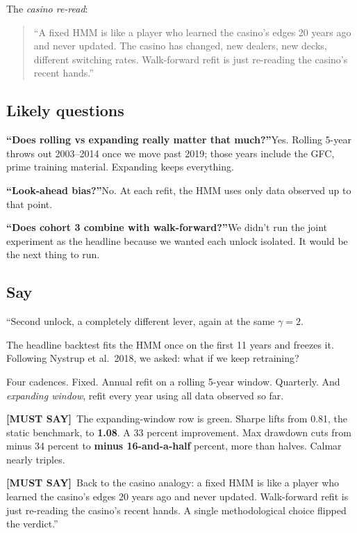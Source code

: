 \documentclass[11pt]{article}
\newcommand{\mustsay}[1]{\textcolor{must}{\textbf{[MUST SAY]}}\ #1}
\begin{document}
The \emph{casino re-read}:

\begin{quote}
``A fixed HMM is like a player who learned the casino's edges 20 years ago and never updated. The casino has changed, new dealers, new decks, different switching rates. Walk-forward refit is just re-reading the casino's recent hands.''
\end{quote}

\subsection*{Likely questions}

\textbf{``Does rolling vs expanding really matter that much?''}\quad Yes. Rolling 5-year throws out 2003--2014 once we move past 2019; those years include the GFC, prime training material. Expanding keeps everything.

\textbf{``Look-ahead bias?''}\quad No. At each refit, the HMM uses only data observed up to that point.

\textbf{``Does cohort 3 combine with walk-forward?''}\quad We didn't run the joint experiment as the headline because we wanted each unlock isolated. It would be the next thing to run.

\subsection*{Say}

``Second unlock, a completely different lever, again at the same $\gamma = 2$.

The headline backtest fits the HMM once on the first 11 years and freezes it. Following Nystrup et al.\ 2018, we asked: what if we keep retraining?

Four cadences. Fixed. Annual refit on a rolling 5-year window. Quarterly. And \emph{expanding window}, refit every year using all data observed so far.

\mustsay{The expanding-window row is green. Sharpe lifts from 0.81, the static benchmark, to \textbf{1.08}. A 33 percent improvement. Max drawdown cuts from minus 34 percent to \textbf{minus 16-and-a-half} percent, more than halves. Calmar nearly triples.}

\mustsay{Back to the casino analogy: a fixed HMM is like a player who learned the casino's edges 20 years ago and never updated. Walk-forward refit is just re-reading the casino's recent hands. A single methodological choice flipped the verdict.''}
\end{document}
